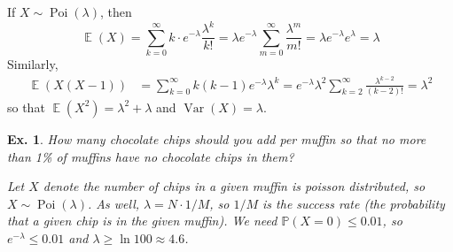 \documentclass[12pt, a4paper]{book}
\DeclareMathOperator{\E}{\mathbb{E}}
\DeclareMathOperator{\Var}{Var}
\DeclareMathOperator{\Poi}{Poi}
\renewcommand{\Pr}{\mathbb{P}}
\newtheorem{example}[theorem]{Ex.}
\theoremstyle{nonumberplain}
\begin{document}
If $X\sim\Poi(\lambda)$, then
\[\E(X)=\sum\limits_{k=0}^\infty k\cdot e^{-\lambda}\frac{\lambda^k}{k!}=\lambda e^{-\lambda}\sum\limits_{m=0}^\infty\frac{\lambda^m}{m!}=\lambda e^{-\lambda}e^{\lambda}=\lambda\]
Similarly,
\begin{align*}
    \E(X(X-1)) &= \sum\limits_{k=0}^\infty k(k-1)e^{-\lambda}{\lambda^k}=e^{-\lambda}{\lambda^2}\sum\limits_{k=2}^\infty\frac{\lambda^{k-2}}{(k-2)!}=\lambda^2
\end{align*}
so that $\E(X^2)=\lambda^2+\lambda$ and $\Var(X)=\lambda$.
\begin{example}
    How many chocolate chips should you add per muffin so that no more than 1\% of muffins have no chocolate chips in them?

    Let $X$ denote the number of chips in a given muffin is poisson distributed, so $X\sim\Poi(\lambda)$.
    As well, $\lambda=N\cdot 1/M$, so $1/M$ is the success rate (the probability that a given chip is in the given muffin).
    We need $\Pr(X=0)\leq 0.01$, so $e^{-\lambda}\leq 0.01$ and $\lambda\geq\ln 100\approx 4.6$.
\end{example}
\end{document}
